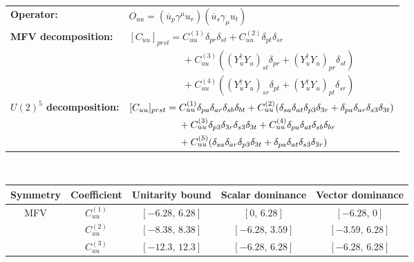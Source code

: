 \begin{table}[htbp]
\centering
{\small
\begin{tabular}{ll}
    \textbf{Operator:} &
        $\boxed{O_{uu} = (\overline u_p \gamma^\mu u_r)(\overline u_s \gamma_\mu u_t)}$ \\[0.2cm]
    \textbf{MFV decomposition:} &
        $[C_{uu}]_{prst} =
            C_{uu}^{(1)}\delta_{pr}\delta_{st}
            + C_{uu}^{(2)}\delta_{pt}\delta_{sr}
            $ \\
        & $\phantom{[C_{uu}]_{prst} ={}}+ C_{uu}^{(3)}((Y_u^\dagger Y_u)_{st}\delta_{pr} + (Y_u^\dagger Y_u)_{pr}\delta_{st})$ \\
        & $\phantom{[C_{uu}]_{prst} ={}}
            + C_{uu}^{(4)}((Y_u^\dagger Y_u)_{sr}\delta_{pt} + (Y_u^\dagger Y_u)_{pt}\delta_{sr})$ \\[0.15cm]
    \textbf{$U(2)^5$ decomposition:} &
        $[C_{uu}]_{prst} =
            C_{uu}^{(1)}\Pij{p}{r}{a}\Pij{s}{t}{b}
            + C_{uu}^{(2)}(\Pij{s}{t}{a}\delta_{p3}\delta_{3r} + \Pij{p}{r}{a}\delta_{s3}\delta_{3t})
            $ \\
        & $\phantom{[C_{uu}]_{prst} ={}}+ C_{uu}^{(3)}\delta_{p3}\delta_{3r}\delta_{s3}\delta_{3t}
            + C_{uu}^{(4)}\Pij{p}{t}{a}\Pij{s}{r}{b}
            $ \\
        & $\phantom{[C_{uu}]_{prst} ={}}+ C_{uu}^{(5)}(\Pij{s}{r}{a}\delta_{p3}\delta_{3t} + \Pij{p}{t}{a}\delta_{s3}\delta_{3r})$ \\
\end{tabular}
\\[0.3cm]
\renewcommand{\arraystretch}{1.3}
\begin{tabular}{ccccc}
    \toprule
    \rowcolor{hdrcolor}
    \textbf{Symmetry} & \textbf{Coefficient}
        & \textbf{Unitarity bound}
        & \textbf{Scalar dominance}
        & \textbf{Vector dominance} \\
    \midrule
    \multirow{4}{*}{MFV}
        & $C_{uu}^{(1)}$ & $[-6.28,\, 6.28]$  & $[0,\, 6.28]$      & $[-6.28,\, 0]$    \\
        & $C_{uu}^{(2)}$ & $[-8.38,\, 8.38]$  & $[-6.28,\, 3.59]$  & $[-3.59,\, 6.28]$ \\
        & $C_{uu}^{(3)}$ & $[-12.3,\, 12.3]$  & $[-6.28,\, 6.28]$  & $[-6.28,\, 6.28]$ \\

\end{tabular}}
\end{table}
